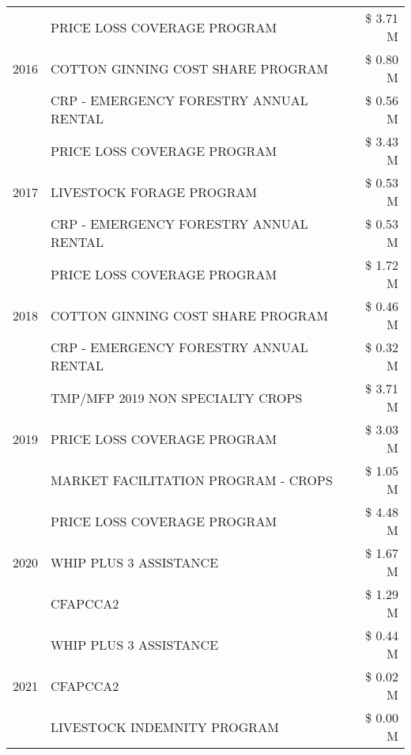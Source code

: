 \begin{tabular}{llr}
\multirow[t]{3}{*}{2016} & PRICE LOSS COVERAGE PROGRAM                   & \$ 3.71 M \\
 & COTTON GINNING COST SHARE PROGRAM             & \$ 0.80 M \\
 & CRP - EMERGENCY FORESTRY ANNUAL RENTAL        & \$ 0.56 M \\
\cline{1-3}
\multirow[t]{3}{*}{2017} & PRICE LOSS COVERAGE PROGRAM & \$ 3.43 M \\
 & LIVESTOCK FORAGE PROGRAM & \$ 0.53 M \\
 & CRP - EMERGENCY FORESTRY ANNUAL RENTAL & \$ 0.53 M \\
\cline{1-3}
\multirow[t]{3}{*}{2018} & PRICE LOSS COVERAGE PROGRAM & \$ 1.72 M \\
 & COTTON GINNING COST SHARE PROGRAM & \$ 0.46 M \\
 & CRP - EMERGENCY FORESTRY ANNUAL RENTAL & \$ 0.32 M \\
\cline{1-3}
\multirow[t]{3}{*}{2019} & TMP/MFP 2019 NON SPECIALTY CROPS & \$ 3.71 M \\
 & PRICE LOSS COVERAGE PROGRAM & \$ 3.03 M \\
 & MARKET FACILITATION PROGRAM - CROPS & \$ 1.05 M \\
\cline{1-3}
\multirow[t]{3}{*}{2020} & PRICE LOSS COVERAGE PROGRAM & \$ 4.48 M \\
 & WHIP PLUS 3 ASSISTANCE & \$ 1.67 M \\
 & CFAPCCA2 & \$ 1.29 M \\
\cline{1-3}
\multirow[t]{3}{*}{2021} & WHIP PLUS 3 ASSISTANCE & \$ 0.44 M \\
 & CFAPCCA2 & \$ 0.02 M \\
 & LIVESTOCK INDEMNITY PROGRAM & \$ 0.00 M \\
\cline{1-3}
\bottomrule
\end{tabular}
